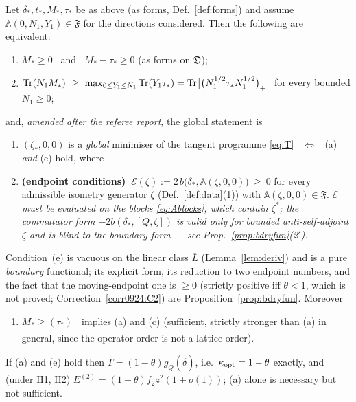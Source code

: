 \documentclass[11pt]{article}
\newcommand{\Aop}{\mathbb A}
\begin{document}
\begin{theorem}\label{thm:kktmain}
Let $\delta_*,t_*,M_*,\tau_*$ be as above (as forms, Def.~\ref{def:forms}) and assume
$\Aop(0,N_1,Y_1)\in\mathfrak F$ for the directions considered.  Then the following are
equivalent:
\begin{enumerate}[leftmargin=2.2em,itemsep=1pt,label=\rm(\alph*)]
\item $M_*\ge0$ \ and \ $M_*-\tau_*\ge0$ (as forms on $\mathfrak D$);
\item[\rm(c)] $\operatorname{Tr}(N_1M_*)\ \ge\ \max_{0\le Y_1\le N_1}\operatorname{Tr}(Y_1\tau_*)
 =\operatorname{Tr}\bigl[\bigl(N_1^{1/2}\tau_*N_1^{1/2}\bigr)_+\bigr]$ for every bounded $N_1\ge0$;
\end{enumerate}
and, \emph{amended after the referee report}, the global statement is
\begin{enumerate}[leftmargin=2.2em,itemsep=1pt,label=\rm(\alph*),start=4]
\item[\rm(d)] $(\zeta_*,0,0)$ is a \emph{global} minimiser of the tangent programme
 \eqref{eq:T} \ $\iff$ \ {\rm(a)} \emph{and} {\rm(e)} hold, where
\item[\rm(e)] \textbf{(endpoint conditions)} $\ \mathcal E(\zeta):=2\,b\bigl(\delta_*,\Aop(\zeta,0,0)\bigr)\ \ge\ 0$
 for every admissible isometry generator $\zeta$ (Def.~\ref{def:data}(1)) with
 $\Aop(\zeta,0,0)\in\mathfrak F$.  \emph{$\mathcal E$ must be evaluated on the blocks
 \eqref{eq:Ablocks}, which contain $\zeta^*$; the commutator form
 $-2b(\delta_*,[Q,\zeta])$ is valid only for bounded anti-self-adjoint $\zeta$ and is blind
 to the boundary form --- see Prop.~\ref{prop:bdryfun}(2$'$).}
\end{enumerate}
Condition~(e) is vacuous on the linear class $\overline L$ (Lemma~\ref{lem:deriv}) and is a
pure \emph{boundary} functional; its explicit form, its reduction to two endpoint numbers,
and the fact that the moving-endpoint one is $\ge0$ (strictly positive iff $\theta<1$, which is not proved; Correction~\ref{corr0924:C2}) are Proposition~\ref{prop:bdryfun}.
Moreover
\begin{enumerate}[leftmargin=2.2em,itemsep=1pt,label=\rm(\alph*),start=2]
\item $M_*\ge(\tau_*)_+$ implies {\rm(a)} and {\rm(c)} (sufficient, strictly stronger than
 {\rm(a)} in general, since the operator order is not a lattice order).
\end{enumerate}
If {\rm(a)} and {\rm(e)} hold then $T=(1-\theta)g_Q(\dot\delta)$, i.e.\
$\kappa_{\rm opt}=1-\theta$ exactly, and (under H1, H2)
$E^{(2)}=(1-\theta)f_2z^2(1+o(1))$; {\rm(a)} alone is necessary but not sufficient.
\end{theorem}
\end{document}
